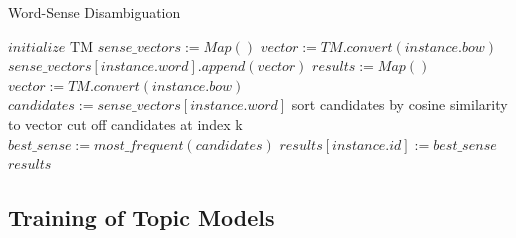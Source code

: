 %
%
\begin{algorithm}[!t]
\caption{Word-Sense Disambiguation}\label{wsdalgorithm}
\begin{algorithmic}[1]
\State $\textit{initialize} \text{ TM} $
\State $\textit{sense\_vectors} := \textit{Map} {()}$
 \State$	vector := TM.convert(instance.bow)$
 \State$	sense\_vectors[instance.word].append(vector)$
\EndFor
\EndProcedure
{}
\State $\textit{results} := \textit{Map} {()}$
 \State$	vector := TM.convert(instance.bow)$
 \State$	candidates := sense\_vectors[instance.word]$
 \State	sort candidates by cosine similarity to vector
 \State	cut off candidates at index k
 \State$	best\_sense := most\_frequent(candidates)$
 \State$	results[instance.id] := best\_sense$
 \State \Return $results$
\EndFor
\EndProcedure
\end{algorithmic}
\end{algorithm}

\subsection{Training of Topic Models}
\label{creation}

